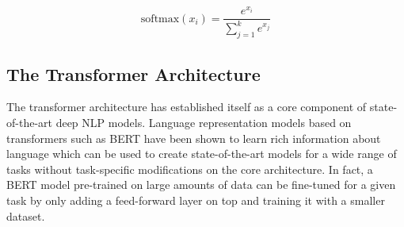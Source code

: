 \begin{equation}
    \textrm{softmax}(x_i) = \frac{e^{x_i}}{\sum_{j=1}^{k}e^{x_j}}
\end{equation}







\subsection{The Transformer Architecture}
The transformer architecture \parencite{transformer}
has established itself as a core component of 
state-of-the-art deep \ac{NLP} models. Language
representation models based on transformers such as
BERT \parencite{bert} have been shown to learn 
rich information about language which can be used to 
create state-of-the-art models for a wide range of tasks 
without task-specific modifications on the core architecture.
In fact, a BERT model pre-trained on large amounts of data
can be fine-tuned for a given task by only adding a 
feed-forward layer on top and training it with a 
smaller dataset.

